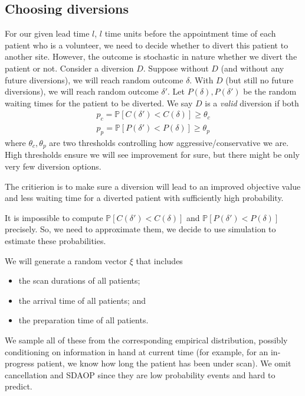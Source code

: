 \subsection{Choosing diversions}

For our given lead time $l$, $l$ time units before the appointment
time of each patient who is a volunteer, we need to
decide whether to divert this patient to another site. However, the
outcome is stochastic in
nature whether we divert the patient or not. Consider a diversion
$D$. Suppose without $D$ (and without any future diversions), we will
reach random outcome $\delta$. With $D$ (but still no future
diversions), we will reach random outcome $\delta'$. Let
$P(\delta), P(\delta')$ be the random waiting times for the patient 
to be diverted. We say $D$ is a \textit{valid} diversion if both
\begin{align*}
  p_c = \mathbb{P}[C(\delta') < C(\delta)] \ge \theta_c   \\
  p_p = \mathbb{P}[P(\delta') < P(\delta)] \ge \theta_p
\end{align*}
where $\theta_c, \theta_p$ are two thresholds controlling how
aggressive/conservative we are. High thresholds ensure we will
see improvement for sure, but there might be only very few
diversion options.

The critierion is to make sure a diversion will lead to an
improved objective value and less waiting time for a diverted
patient with sufficiently high probability.

It is impossible to compute $\mathbb{P}[C(\delta') < C(\delta)]$ and
$\mathbb{P}[P(\delta') < P(\delta)]$ precisely. So, we need to approximate
them, we decide to use simulation to estimate these probabilities.

We will generate a random vector $\xi$ that includes
\begin{itemize}
\item the scan durations of all patients;
\item the arrival time of all patients; and
\item the preparation time of all patients.
\end{itemize}
We sample all of these from the corresponding empirical distribution,
possibly conditioning on information in hand at current time
(for example, for an in-progress patient, we know how long the patient
has been under scan). We omit cancellation and SDAOP since
they are low probability events and hard to predict.

